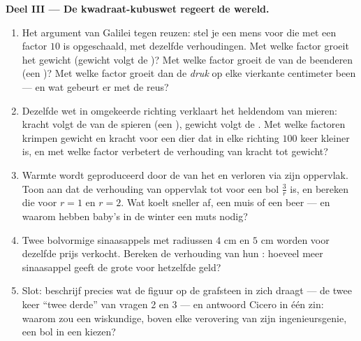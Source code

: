 \begin{problem}
\medskip
\noindent\textbf{Deel III --- De kwadraat-kubuswet regeert de wereld.}
\begin{enumerate}[resume]
  \item Het argument van Galilei tegen reuzen: stel je een mens voor die met een
        factor $10$ is opgeschaald, met dezelfde verhoudingen. Met welke factor
        groeit het gewicht (gewicht volgt de )? Met welke factor groeit de
         van de beenderen (een )? Met welke factor groeit dan de
        \emph{druk} op elke vierkante centimeter been --- en wat gebeurt er met de
        reus?
  \item Dezelfde wet in omgekeerde richting verklaart het heldendom van mieren:
        kracht volgt de  van de spieren (een ), gewicht volgt de
        . Met welke factoren krimpen gewicht en kracht voor een dier dat in
        elke richting $100$ keer kleiner is, en met welke factor verbetert de
        verhouding van kracht tot gewicht?
  \item Warmte wordt geproduceerd door de  van het  en verloren via
        zijn oppervlak. Toon aan dat de verhouding van oppervlak tot  voor een
        bol $\frac{3}{r}$ is, en bereken die voor $r = 1$ en $r = 2$. Wat koelt
        sneller af, een muis of een beer --- en waarom hebben baby's in de winter een
        muts nodig?
  \item Twee bolvormige sinaasappels met radiussen $4$ cm en $5$ cm worden voor
        dezelfde prijs verkocht. Bereken de verhouding van hun : hoeveel
        meer sinaasappel geeft de grote voor hetzelfde geld?
  \item Slot: beschrijf precies wat de figuur op de grafsteen in zich draagt --- de
        twee
        keer ``twee derde'' van vragen 2 en 3 --- en antwoord Cicero in één zin:
        waarom zou een wiskundige, boven elke verovering van zijn ingenieursgenie,
        een bol in een  kiezen?
\end{enumerate}
\end{problem}

